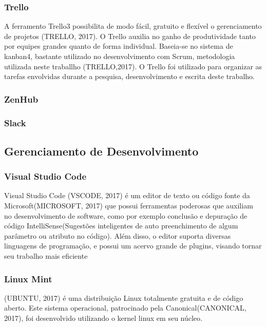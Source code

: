 \subsubsection{Trello}

A ferramento Trello3 possibilita de modo fácil, gratuito e flexível o gerenciamento de projetos (TRELLO, 2017). O Trello auxilia no ganho de produtividade tanto por equipes grandes quanto de forma individual. Baseia-se no sistema de kanban4, bastante utilizado no desenvolvimento com Scrum, metodologia utilizada neste traballho (TRELLO,2017). O Trello foi utilizado para organizar as tarefas envolvidas durante a pesquisa, desenvolvimento e escrita deste trabalho.

\subsubsection{ZenHub}

\subsubsection{Slack}

\subsection{Gerenciamento de Desenvolvimento}

\subsubsection{Visual Studio Code}

Visual Studio Code (VSCODE, 2017) é um editor de texto ou código fonte da Microsoft(MICROSOFT, 2017) que possui ferramentas poderosas que auxiliam no desenvolvimento de software, como por exemplo conclusão e depuração de código IntelliSense(Sugestões inteligentes de auto preenchimento de algum parâmetro ou atributo no código). Além disso, o editor suporta diversas linguagens de programação, e possui um acervo grande de plugins, visando tornar seu trabalho mais eficiente

\subsubsection{Linux Mint}
(UBUNTU, 2017) é uma distribuição Linux totalmente gratuita e de código aberto. Este sistema operacional, patrocinado pela Canonical(CANONICAL, 2017), foi desenvolvido utilizando o kernel linux em seu núcleo.


